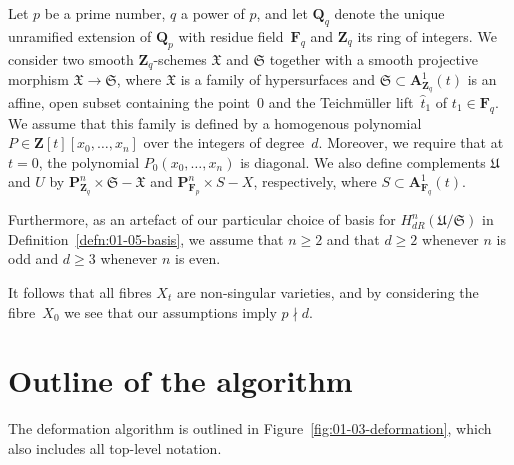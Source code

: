 \begin{notation} \label{not:01-03-main}
Let $p$ be a prime number, $q$ a power of $p$, and let $\mathbf{Q}_q$ 
denote the unique unramified extension of $\mathbf{Q}_p$ with residue 
field~$\mathbf{F}_q$ and $\mathbf{Z}_q$ its ring of integers.  
We consider two smooth $\mathbf{Z}_q$-schemes $\mathfrak{X}$ and $\mathfrak{S}$ 
together with a smooth projective morphism $\mathfrak{X} \to \mathfrak{S}$, 
where $\mathfrak{X}$ is a family of hypersurfaces 
and $\mathfrak{S} \subset \mathbf{A}_{\mathbf{Z}_q}^1(t)$ is an affine, open 
subset containing the point~$0$ and the Teichm\"uller lift~$\hat{t}_1$ of 
$t_1 \in \mathbf{F}_q$.  
We assume that this family is defined by a homogenous polynomial 
$P \in \mathbf{Z}[t][x_0,\dotsc,x_n]$ over the integers of degree~$d$.  
Moreover, we require that at $t = 0$, the polynomial $P_0(x_0,\dotsc,x_n)$ 
is diagonal.  
We also define complements 
$\mathfrak{U}$ and $U$ by $\mathbf{P}_{\mathbf{Z}_q}^n \times \mathfrak{S} - \mathfrak{X}$ 
and $\mathbf{P}_{\mathbf{F}_p}^n \times S - X$, respectively, 
where $S \subset \mathbf{A}_{\mathbf{F}_q}^1(t)$.  
\end{notation}

\begin{notation}
Furthermore, as an artefact of our particular choice of basis for 
$H_{dR}^n(\mathfrak{U}/\mathfrak{S})$ in Definition~\ref{defn:01-05-basis}, 
we assume that $n \geq 2$ and that $d \geq 2$ whenever $n$ is odd and 
$d \geq 3$ whenever $n$ is even.
\end{notation}

\begin{rem}
It follows that all fibres $X_t$ are non-singular varieties, and by 
considering the fibre~$X_0$ we see that our assumptions imply $p \nmid d$.
\end{rem}


\section{Outline of the algorithm}

The deformation algorithm is outlined in Figure~\ref{fig:01-03-deformation}, 
which also includes all top-level notation.

